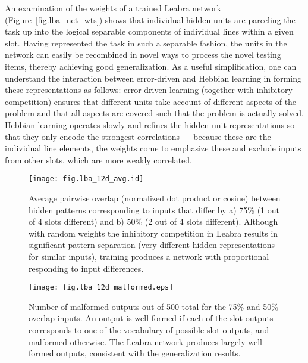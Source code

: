 \documentclass[12pt,twoside]{article}
\begin{document}
An examination of the weights of a trained Leabra network
(Figure~\ref{fig.lba_net_wts}) shows that individual hidden units are
parceling the task up into the logical separable components of
individual lines within a given slot.  Having represented the task in
such a separable fashion, the units in the network can easily be
recombined in novel ways to process the novel testing items, thereby
achieving good generalization.  As a useful simplification, one can
understand the interaction between error-driven and Hebbian learning
in forming these representations as follows: error-driven learning
(together with inhibitory competition) ensures that different units
take account of different aspects of the problem and that all aspects
are covered such that the problem is actually solved.  Hebbian
learning operates slowly and refines the hidden unit representations
so that they only encode the strongest correlations --- because these
are the individual line elements, the weights come to emphasize these
and exclude inputs from other slots, which are more weakly correlated.

\begin{figure}
  \centering\texttt{[image: fig.lba\_12d\_avg.id]}
  \caption{\small Average pairwise overlap (normalized dot product or
    cosine) between hidden patterns corresponding to inputs that
    differ by a) 75\% (1 out of 4 slots different) and b) 50\% (2 out
    of 4 slots different).  Although with random weights the
    inhibitory competition in Leabra results in significant pattern
    separation (very different hidden representations for similar
    inputs), training produces a network with proportional responding
    to input differences.}
  \label{fig.lba_12d_avg}
\end{figure}

\begin{figure}
  \centering\texttt{[image: fig.lba\_12d\_malformed.eps]}
  \caption{\small Number of malformed outputs out of 500 total for the
    75\% and 50\% overlap inputs.  An output is well-formed if each of
    the slot outputs corresponds to one of the vocabulary of possible
    slot outputs, and malformed otherwise. The Leabra network produces
    largely well-formed outputs, consistent with the generalization
    results.}
  \label{fig.lba_12d_malformed}
\end{figure}
\end{document}
